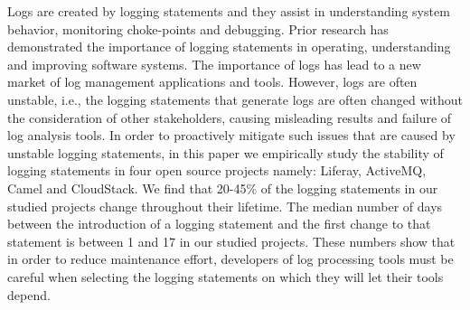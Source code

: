 Logs are created by logging statements and they	assist in understanding system behavior, monitoring choke-points and debugging. Prior research has demonstrated the importance of logging statements in operating, understanding and improving software systems. The importance of logs has lead to a new market of log management applications and tools. However, logs are often unstable, i.e., the logging statements that generate logs are often changed without the consideration of other stakeholders, causing misleading results and failure of log analysis tools. In order to proactively mitigate such issues that are caused by unstable logging statements, in this paper we empirically study the stability of logging statements in four open source projects namely: Liferay, ActiveMQ, Camel and CloudStack. We find that 20-45\% of the logging statements in our studied projects change throughout their lifetime. The median number of days between the introduction of a logging statement and the first change to that statement is between 1 and 17 in our studied projects. These numbers show that in order to reduce maintenance effort, developers of log processing tools must be careful when selecting the logging statements on which they will let their tools depend.


